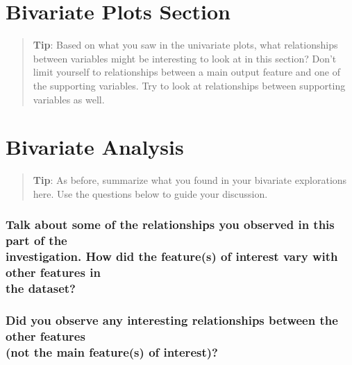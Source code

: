\documentclass[]{article}
\begin{document}
\section{Bivariate Plots Section}\label{bivariate-plots-section}

\begin{quote}
\textbf{Tip}: Based on what you saw in the univariate plots, what
relationships between variables might be interesting to look at in this
section? Don't limit yourself to relationships between a main output
feature and one of the supporting variables. Try to look at
relationships between supporting variables as well.
\end{quote}

\section{Bivariate Analysis}\label{bivariate-analysis}

\begin{quote}
\textbf{Tip}: As before, summarize what you found in your bivariate
explorations here. Use the questions below to guide your discussion.
\end{quote}

\subsubsection{\texorpdfstring{Talk about some of the relationships you
observed in this part of the\\
investigation. How did the feature(s) of interest vary with other
features in\\
the
dataset?}{Talk about some of the relationships you observed in this part of the investigation. How did the feature(s) of interest vary with other features in the dataset?}}\label{talk-about-some-of-the-relationships-you-observed-in-this-part-of-the-investigation.-how-did-the-features-of-interest-vary-with-other-features-in-the-dataset}

\subsubsection{\texorpdfstring{Did you observe any interesting
relationships between the other features\\
(not the main feature(s) of
interest)?}{Did you observe any interesting relationships between the other features (not the main feature(s) of interest)?}}\label{did-you-observe-any-interesting-relationships-between-the-other-features-not-the-main-features-of-interest}
\end{document}
